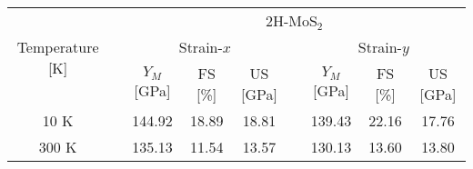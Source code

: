 \documentclass[a4paper,fleqn]{cas-sc}
\begin{document}
	\begin{table*}[]
		\begin{tabular}{clccclccc}
			\hline
			\multicolumn{1}{c}{\multirow{3}{*}{Temperature [K]}} & \multicolumn{1}{l}{} &                                                                                                      \multicolumn{7}{c}{2H-MoS$_2$}                                                                                                       \\ \cline{3-9}
			                  \multicolumn{1}{c}{}                   & \multicolumn{1}{l}{} &                                     \multicolumn{3}{c}{ Strain-$x$}                                      & \multicolumn{1}{l}{} &                                      \multicolumn{3}{c}{Strain-$y$}                                      \\ \cline{3-5}\cline{7-9}
			                  \multicolumn{1}{c}{}                   & \multicolumn{1}{l}{} & \multicolumn{1}{c}{$Y_M$ {[}GPa{]}} & \multicolumn{1}{c}{FS {[}\%{]}} & \multicolumn{1}{c}{US {[}GPa{]}} & \multicolumn{1}{l}{} & \multicolumn{1}{c}{$Y_M$ {[}GPa{]}} & \multicolumn{1}{c}{FS {[}\%{]}} & \multicolumn{1}{c}{US {[}GPa{]}} \\ \cline{1-1}\cline{3-5}\cline{7-9}
			                          10 K                            &                      &               144.92                &              18.89              &              18.81               &                      &               139.43                &              22.16              &              17.76               \\
			                \multicolumn{1}{c}{300 K}                 & \multicolumn{1}{l}{} &     \multicolumn{1}{c}{135.13}      &    \multicolumn{1}{c}{11.54}    &    \multicolumn{1}{c}{13.57}     & \multicolumn{1}{l}{} &     \multicolumn{1}{c}{130.13}      &    \multicolumn{1}{c}{13.60}    &    \multicolumn{1}{c}{13.80}
		\end{tabular}
		

\end{table*}
\end{document}
